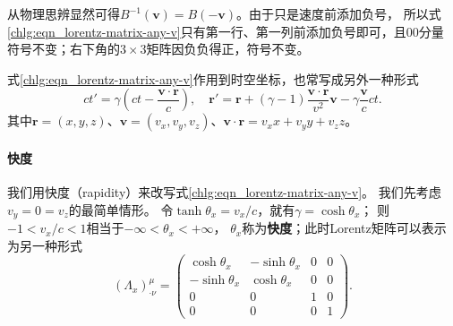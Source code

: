 从物理思辨显然可得$B^{-1}(\boldsymbol{v})=B(\boldsymbol{-v})$。由于只是速度前添加负号，
所以式\eqref{chlg:eqn_lorentz-matrix-any-v}只有第一行、第一列前添加负号即可，且$00$分量
符号不变；右下角的$3\times 3$矩阵因负负得正，符号不变。

式\eqref{chlg:eqn_lorentz-matrix-any-v}作用到时空坐标，也常写成另外一种形式
\begin{equation}\label{chlg:eqn_boost-xt}
    ct'= \gamma\left( ct-\frac{\boldsymbol{v}\cdot\boldsymbol{r}}{c}\right) , \quad
    \boldsymbol{r}' = \boldsymbol{r}+(\gamma-1)\frac{\boldsymbol{v}
        \cdot\boldsymbol{r}}{v^2}\boldsymbol{v}-\gamma \frac{\boldsymbol{v}}{c} ct.
\end{equation}
其中$\boldsymbol{r}=(x,y,z)$、$\boldsymbol{v}=(v_x, v_y, v_z )$、$\boldsymbol{v}\cdot \boldsymbol{r}=v_x x+v_y y+v_z z$。

\paragraph{快度}\label{chlg:sec_rapid}
我们用{\kaishu 快度}（rapidity）来改写式\eqref{chlg:eqn_lorentz-matrix-any-v}。
我们先考虑$v_y=0=v_z$的最简单情形。
令$\tanh \theta_x=v_x/c$，就有$\gamma = \cosh \theta_x$；
则$-1<v_x/c<1$相当于$-\infty < \theta_x <+\infty$，
$\theta_x$称为\textbf{快度}；此时Lorentz矩阵可以表示为另一种形式
\begin{equation}\label{chlg:eqn_lorentz-rapid-x}
    (\Lambda_x)^{\mu}_{\cdot \nu} = 
    \begin{pmatrix}
        \cosh\theta_x  & -\sinh\theta_x & 0 & 0 \\
        -\sinh\theta_x & \cosh\theta_x  & 0 & 0 \\
        0 & 0 & 1 & 0 \\
        0 & 0 & 0 & 1 
    \end{pmatrix}.
\end{equation}

